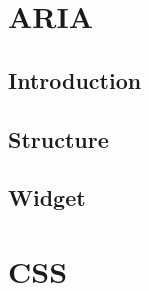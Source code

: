 \documentclass[10pt,a4paper,landscape]{article}
\author{Franck Petitdemange}
\begin{document}
\section{ARIA}
\subsection{Introduction}
\subsection{Structure}
\subsection{Widget}

\section{CSS}
\end{document}
